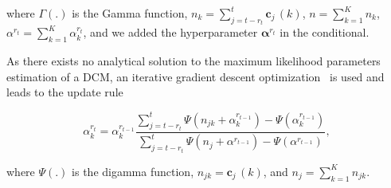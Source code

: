 where $\Gamma(.)$ is the Gamma function, $n_k=\sum_{j=t-r_t}^t
\mathbf{c}_j\,(k)$, $n=\sum_{k=1}^K n_k$,
$\alpha^{r_t}=\sum_{k=1}^K\alpha^{r_t}_k$, and we added the hyperparameter
$\boldsymbol{\alpha}^{r_t}$ in the conditional.

As there exists no analytical solution to the maximum likelihood parameters
estimation of a DCM, an iterative gradient descent
optimization~\cite{minka03estimating} is used and leads to the update rule

\begin{equation}
\label{eqn:alpha_update}
\alpha_k^{r_t} = \alpha^{r_{t-1}}_k\frac{\sum_{j=t-r_t}^t\Psi(n_{jk}+
\alpha^{r_{t-1}}_k)-\Psi(\alpha^{r_{t-1}}_k)}{\sum_{j=t-r_t}^t\Psi(n_j+
\alpha^{r_{t-1}})-\Psi(\alpha^{r_{t-1}})},
\end{equation}

where $\Psi(.)$ is the digamma function, $n_{jk}=\mathbf{c}_j\,(k)$, and
$n_j=\sum_{k=1}^K n_{jk}$.

